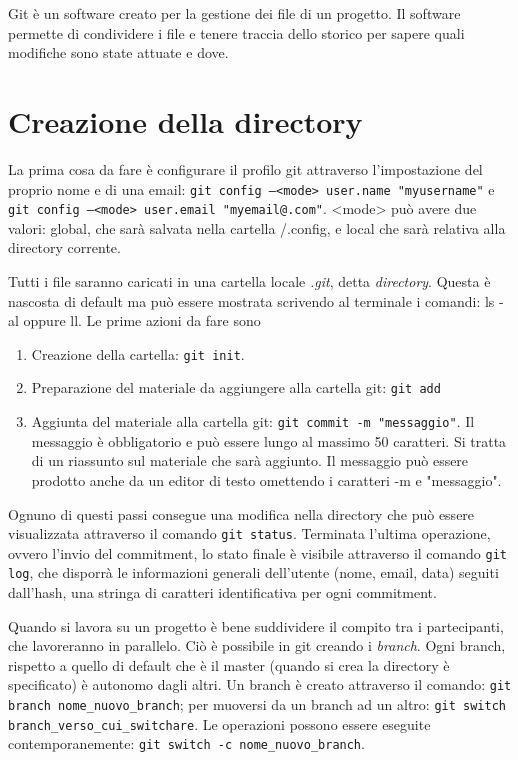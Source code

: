 Git è un software creato per la gestione dei file di un progetto. Il software permette di condividere i file e tenere traccia dello storico per sapere quali modifiche sono state attuate e dove. 

\section{Creazione della directory}
La prima cosa da fare è configurare il profilo git attraverso l'impostazione del proprio nome e di una email: \texttt{git config --<mode> user.name "myusername"} e \texttt{git config --<mode> user.email "myemail@.com"}.
<mode> può avere due valori: global, che sarà salvata nella cartella /.config, e local che sarà relativa alla directory corrente.

Tutti i file saranno caricati in una cartella locale \emph{.git}, detta \emph{directory}. Questa è nascosta di default ma può essere mostrata scrivendo al terminale i comandi: ls -al oppure ll. 
Le prime azioni da fare sono
\begin{enumerate} 
    \item Creazione della cartella: \texttt{git init}. 
    \item Preparazione del materiale da aggiungere alla cartella git: \texttt{git add}
    \item Aggiunta del materiale alla cartella git: \texttt{git commit -m "messaggio"}. Il messaggio è obbligatorio e può essere lungo al massimo 50 caratteri. Si tratta di un riassunto sul materiale che sarà aggiunto. Il messaggio può essere prodotto anche da un editor di testo omettendo i caratteri -m e "messaggio".
\end{enumerate}
Ognuno di questi passi consegue una modifica nella directory che può essere visualizzata attraverso il comando \texttt{git status}. 
Terminata l'ultima operazione, ovvero l'invio del commitment, lo stato finale è visibile  attraverso il comando \texttt{git log}, che disporrà le informazioni generali dell'utente (nome, email, data) seguiti dall'hash, una stringa di caratteri identificativa per ogni commitment.

Quando si lavora su un progetto è bene suddividere il compito tra i partecipanti, che lavoreranno in parallelo. Ciò è possibile in git creando i \emph{branch}. Ogni branch, rispetto a quello di default che è il master (quando si crea la directory è specificato) è autonomo dagli altri. 
Un branch è creato attraverso il comando: \texttt{git branch nome\_nuovo\_branch}; per muoversi da un branch ad un altro: \texttt{git switch branch\_verso\_cui\_switchare}.
Le operazioni possono essere eseguite contemporanemente: \texttt{git switch -c nome\_nuovo\_branch}. 

